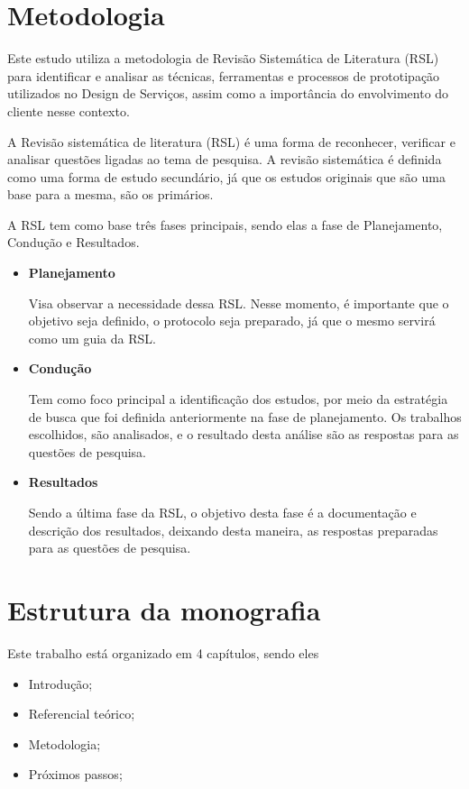 \section{Metodologia}

Este estudo utiliza a metodologia de Revisão Sistemática de Literatura (RSL) para identificar e analisar as técnicas, ferramentas e processos de prototipação utilizados no Design de Serviços, assim como a importância do envolvimento do cliente nesse contexto. 

A Revisão sistemática de literatura (RSL) é uma forma de reconhecer, verificar e analisar questões ligadas ao tema de pesquisa. A revisão sistemática é definida como uma forma de estudo secundário, já que os estudos originais que são uma base para a mesma, são os primários.

A RSL tem como base três fases principais, sendo elas a fase de Planejamento, Condução e Resultados.

\begin{itemize}
	\item \textbf{Planejamento}
	
	Visa observar a necessidade dessa RSL. Nesse momento, é importante que o objetivo seja definido, o protocolo seja preparado, já que o mesmo servirá como um guia da RSL.
	
	\item \textbf{Condução}
	
	Tem como foco principal a identificação dos estudos, por meio da estratégia de busca que foi definida anteriormente na fase de planejamento. Os trabalhos escolhidos, são analisados, e o resultado desta análise são as respostas para as questões de pesquisa.
	
	
	\item \textbf{Resultados}
	
	Sendo a última fase da RSL, o objetivo desta fase é a documentação e descrição dos resultados, deixando desta maneira, as respostas preparadas para as questões de pesquisa.
\end{itemize}

\section{Estrutura da monografia}

Este trabalho está organizado em 4 capítulos, sendo eles

\begin{itemize}
	\item Introdução;
	
	\item Referencial teórico;
	
	\item Metodologia;
	
	\item Próximos passos;
\end{itemize}
